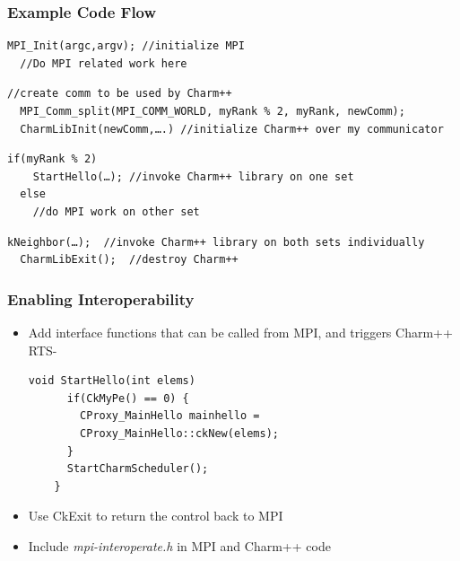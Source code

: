 \begin{frame}[fragile]
  \frametitle{Example Code Flow}
  \begin{lstlisting}[basicstyle=\footnotesize]
  MPI_Init(argc,argv); //initialize MPI
  //Do MPI related work here
  \end{lstlisting}
  \begin{lstlisting}[basicstyle=\footnotesize]
  //create comm to be used by Charm++
  MPI_Comm_split(MPI_COMM_WORLD, myRank % 2, myRank, newComm); 
  CharmLibInit(newComm,….) //initialize Charm++ over my communicator
  \end{lstlisting}
  \begin{lstlisting}[basicstyle=\footnotesize]
  if(myRank % 2) 
    StartHello(…); //invoke Charm++ library on one set
  else 
    //do MPI work on other set
  \end{lstlisting}
  \begin{lstlisting}[basicstyle=\footnotesize]
  kNeighbor(…);  //invoke Charm++ library on both sets individually
  CharmLibExit();  //destroy Charm++ 
  \end{lstlisting}
\end{frame}

\begin{frame}[fragile]

  \frametitle{Enabling Interoperability}

  \begin{itemize}
    \item Add interface functions that can be called from MPI, and triggers
    Charm++ RTS-
    \begin{lstlisting}[basicstyle=\footnotesize]
    void StartHello(int elems)
      if(CkMyPe() == 0) {
        CProxy_MainHello mainhello =
        CProxy_MainHello::ckNew(elems); 
      }
      StartCharmScheduler();
    }
    \end{lstlisting}
  \item Use CkExit to return the control back to MPI
  \item Include {\em mpi-interoperate.h} in MPI and Charm++ code
  \end{itemize}
\end{frame}



